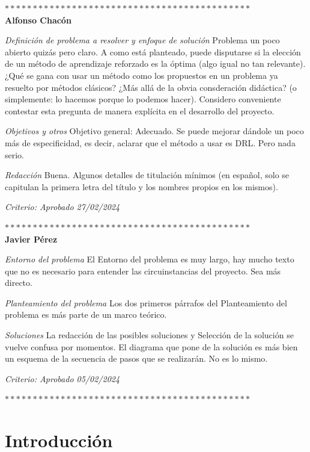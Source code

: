 
$********************************************$\\
\textbf{Alfonso Chacón} 

\textit{Definición de problema a resolver y enfoque de solución}
Problema un poco abierto quizás pero claro. 
A como está planteado, puede disputarse si la elección de un método de aprendizaje reforzado es la óptima (algo igual no tan relevante). ¿Qué se gana con usar un método como los propuestos en un problema ya resuelto por métodos clásicos? 
¿Más allá de la obvia consderación didáctica? (o simplemente: lo hacemos porque lo podemos hacer). Considero conveniente contestar esta pregunta de manera explícita en el desarrollo del proyecto.

\textit{Objetivos y otros}
Objetivo general: Adecuado. Se puede mejorar dándole un poco más de especificidad, es decir, aclarar que el método a usar es DRL. Pero nada serio.

\textit{Redacción}
Buena. Algunos detalles de titulación mínimos (en español, solo se capitulan la primera letra del título y los nombres propios en los mismos).

\textit{Criterio: Aprobado  27/02/2024}

$********************************************$\\
\textbf{Javier Pérez}

\textit{Entorno del problema}
El Entorno del problema es muy largo, hay mucho texto que no es necesario para entender las circuinstancias del proyecto. Sea más directo.

\textit{Planteamiento del problema}
Los dos primeros párrafos del Planteamiento del problema es más parte de un marco teórico.

\textit{Soluciones}
La redacción de las posibles soluciones y Selección de la solución se vuelve confusa por momentos.
El diagrama que pone de la solución es más bien un esquema de la secuencia de pasos que se realizarán. No es lo mismo.

\textit{Criterio: Aprobado  05/02/2024}

$********************************************$\\

\chapter{Introducción}
\label{chp:intro}



